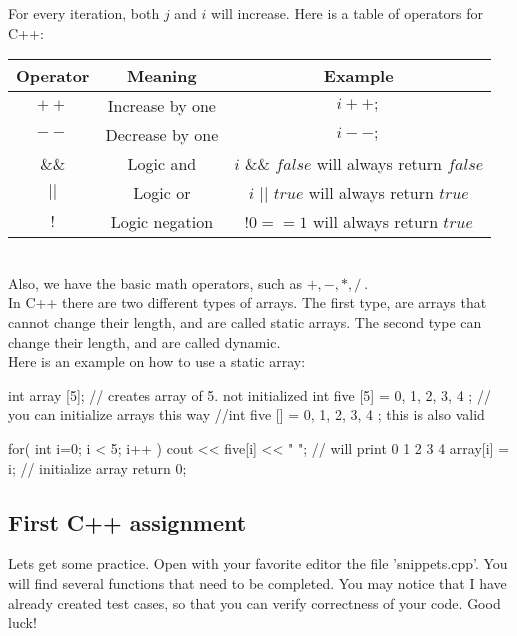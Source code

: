 \documentclass[../notebook.tex]{../subfiles/subfiles}
\begin{document}
For every iteration, both $j$ and $i$ will increase. Here is a table of operators for C++:\\
\begin{tabular}{|c | c | c |}
  \hline
  {\bf Operator} & {\bf Meaning} & {\bf Example} \\ 
  \hline
  $++$& Increase by one & $i++;$  \\
  \hline
  $--$& Decrease by one & $i--;$  \\
  \hline
  $\&\&$ & Logic and & $ i$ \&\& $false  $ will always return $false$ \\
  \hline
  $||$ & Logic or & $ i$ $||$ $true  $ will always return $true$ \\
  $!$ & Logic negation &  $!0 == 1  $ will always return $true$ \\
  \hline
\end{tabular}\\

Also, we have the basic math operators, such as $+,-,*,/\ $.\\
In C++ there are two different types of arrays. The first type, are arrays that cannot change their length, and are called static arrays. The second type can change their length, and are called dynamic.\\
Here is an example on how to use a static array:
\begin{cppcode}
  int array [5]; // creates array of 5. not initialized
  int five  [5] = { 0, 1, 2, 3, 4 }; // you can initialize arrays this way
  //int five [] = { 0, 1, 2, 3, 4 }; this is also valid

  for( int i=0; i < 5; i++ )
  {
    cout << five[i] << "  "; // will print 0 1 2 3 4
    array[i] = i; // initialize array
  }
  return 0; 
\end{cppcode}
\subsection{First C++ assignment} %
\label{sub:First C++ assignment}
Lets get some practice. Open with your favorite editor the file 'snippets.cpp'. You will find several functions that need to be completed. You may notice that I have already created test cases, so that you can verify correctness of your code. Good luck!
\end{document}
